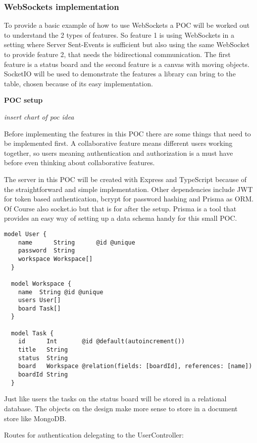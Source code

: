 \subsubsection{WebSockets implementation}

To provide a basic example of how to use WebSockets a POC will be worked out to understand the 2 types of features. So feature 1 is using WebSockets in a setting where Server Sent-Events is sufficient but also using the same WebSocket to provide feature 2, that needs the bidirectional communication. The first feature is a status board and the second feature is a canvas with moving objects. SocketIO will be used to demonstrate the features a library can bring to the table, chosen because of its easy implementation.

\textbf{POC setup}

\textit{insert chart of poc idea}

Before implementing the features in this POC there are some things that need to be implemented first. A collaborative feature means different users working together, so users meaning authentication and authorization is a must have before even thinking about collaborative features.

The server in this POC will be created with Express and TypeScript because of the straightforward and simple implementation. Other dependencies include JWT for token based authentication, bcrypt for password hashing and Prisma as ORM. Of Course also socket.io but that is for after the setup. Prisma is a tool that provides an easy way of setting up a data schema handy for this small POC.

\begin{lstlisting}[caption=Prisma Data Schema]
  model User {
    name      String      @id @unique
    password  String
    workspace Workspace[]
  }

  model Workspace {
    name  String @id @unique
    users User[]
    board Task[]
  }

  model Task {
    id      Int       @id @default(autoincrement())
    title   String
    status  String
    board   Workspace @relation(fields: [boardId], references: [name])
    boardId String
  }
\end{lstlisting}

Just like users the tasks on the status board will be stored in a relational database. The objects on the design make more sense to store in a document store like MongoDB.

Routes for authentication delegating to the UserController:

